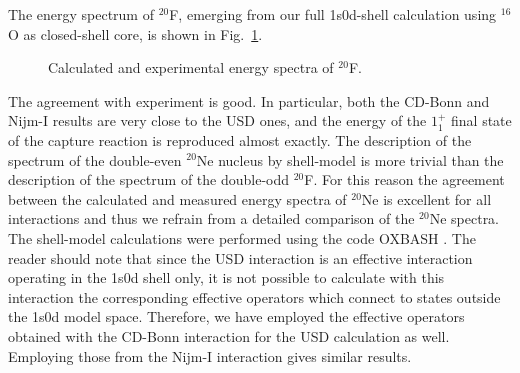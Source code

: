 \documentclass[12pt]{iopart}
\begin{document}
The energy spectrum of $^{20}$F, emerging from our full 1s0d-shell calculation
using $^{16}$O
as closed-shell core, is shown in Fig.\ \ref{fig:spec}. 
\begin{figure}
       \begin{center}
        \caption{Calculated and experimental  energy spectra
        of $^{20}$F.}
        \label{fig:spec}
        \end{center}
\end{figure}
The agreement with experiment is good.
In particular, both the CD-Bonn and Nijm-I results are very close to
the USD ones, and the energy of the $1^+_1$ final state of the capture reaction is
reproduced almost exactly. The description of the spectrum of the double-even
$^{20}$Ne nucleus by shell-model is more trivial than the description of the
spectrum of the double-odd $^{20}$F. For this reason the agreement between the
calculated and measured \cite{CD} energy spectra of $^{20}$Ne is excellent
for all interactions and thus we refrain from a detailed comparison of the
$^{20}$Ne spectra. The shell-model calculations were performed using
the code OXBASH \cite{oxb88}. The reader should note that 
since the USD interaction is an effective
interaction operating in the 1s0d shell only, it is not possible to calculate
with this interaction
the corresponding effective operators which connect to states outside the
1s0d model space. Therefore, we have employed the effective operators obtained
with the CD-Bonn interaction 
for the USD calculation as well. Employing those from the 
Nijm-I interaction gives similar results.
\end{document}
